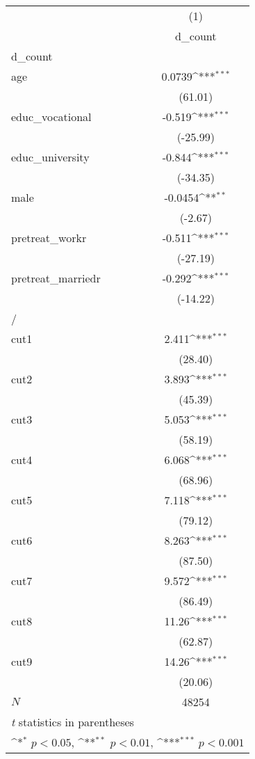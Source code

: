 {
\def\sym#1{\ifmmode^{#1}\else\(^{#1}\)\fi}
\begin{tabular}{l*{1}{c}}
\hline\hline
            &\multicolumn{1}{c}{(1)}\\
            &\multicolumn{1}{c}{d\_count}\\
\hline
d\_count     &                     \\
age         &      0.0739\sym{***}\\
            &     (61.01)         \\
[1em]
educ\_vocational&      -0.519\sym{***}\\
            &    (-25.99)         \\
[1em]
educ\_university&      -0.844\sym{***}\\
            &    (-34.35)         \\
[1em]
male        &     -0.0454\sym{**} \\
            &     (-2.67)         \\
[1em]
pretreat\_workr&      -0.511\sym{***}\\
            &    (-27.19)         \\
[1em]
pretreat\_marriedr&      -0.292\sym{***}\\
            &    (-14.22)         \\
\hline
/           &                     \\
cut1        &       2.411\sym{***}\\
            &     (28.40)         \\
[1em]
cut2        &       3.893\sym{***}\\
            &     (45.39)         \\
[1em]
cut3        &       5.053\sym{***}\\
            &     (58.19)         \\
[1em]
cut4        &       6.068\sym{***}\\
            &     (68.96)         \\
[1em]
cut5        &       7.118\sym{***}\\
            &     (79.12)         \\
[1em]
cut6        &       8.263\sym{***}\\
            &     (87.50)         \\
[1em]
cut7        &       9.572\sym{***}\\
            &     (86.49)         \\
[1em]
cut8        &       11.26\sym{***}\\
            &     (62.87)         \\
[1em]
cut9        &       14.26\sym{***}\\
            &     (20.06)         \\
\hline
\(N\)       &       48254         \\
\hline\hline
\multicolumn{2}{l}{\footnotesize \textit{t} statistics in parentheses}\\
\multicolumn{2}{l}{\footnotesize \sym{*} \(p<0.05\), \sym{**} \(p<0.01\), \sym{***} \(p<0.001\)}\\
\end{tabular}
}
